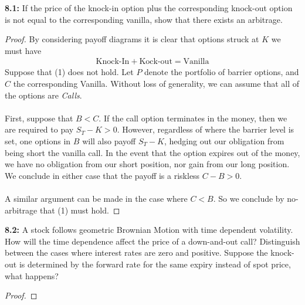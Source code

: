 \documentclass{article}
\begin{document}
\begin{tcolorbox}[colframe=black,colback=gray!5,boxrule=0.5pt]
\textbf{8.1:} If the price of the knock-in option plus the corresponding knock-out option is not equal to the corresponding vanilla, show that there exists an arbitrage. 
\end{tcolorbox}
\begin{proof}
    By considering payoff diagrams it is clear that options struck at $K$ we must have
    \begin{align*}
        \text{Knock-In} + \text{Kock-out} = \text{Vanilla} \tag{1}
    \end{align*}
    Suppose that (1) does not hold. Let $P$ denote the portfolio of barrier options, and $C$ the corresponding Vanilla. Without loss of generality, we can assume that all of the options are \textit{Calls}.\\
    \\
    First, suppose that $B< C$. If the call option terminates in the money, then we are required to pay $S_T-K>0$. However, regardless of where the barrier level is set, one options in $B$ will also payoff $S_T-K$, hedging out our obligation from being short the vanilla call. In the event that the option expires out of the money, we have no obligation from our  short position, nor gain from our long position. We conclude in either case that the payoff is a riskless $C-B > 0$. \\
    \\
    A similar argument can be made in the case where $C < B$. So we conclude by no-arbitrage that (1) must hold.
\end{proof}


\begin{tcolorbox}[colframe=black,colback=gray!5,boxrule=0.5pt]
\textbf{8.2:} A stock follows geometric Brownian Motion with time dependent volatility. How will the time dependence affect the price of a down-and-out call? Distinguish between the cases where interest rates are zero and positive. Suppose the knock-out is determined by the forward rate for the same expiry instead of spot price, what happens? 
\end{tcolorbox}
\begin{proof}
    
\end{proof}
\end{document}
